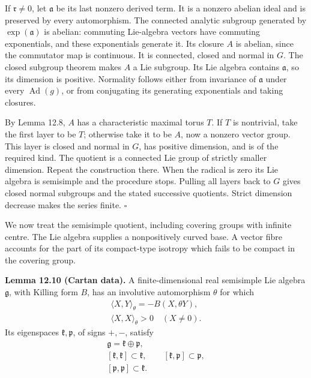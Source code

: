 \documentclass[
  11pt,
]{article}
\begin{document}
If \(\mathfrak r\ne0\), let \(\mathfrak a\) be its last nonzero derived
term. It is a nonzero abelian ideal and is preserved by every
automorphism. The connected analytic subgroup generated by
\(\exp(\mathfrak a)\) is abelian: commuting Lie-algebra vectors have
commuting exponentials, and these exponentials generate it. Its closure
\(A\) is abelian, since the commutator map is continuous. It is
connected, closed and normal in \(G\). The closed subgroup theorem makes
\(A\) a Lie subgroup. Its Lie algebra contains \(\mathfrak a\), so its
dimension is positive. Normality follows either from invariance of
\(\mathfrak a\) under every \(\operatorname{Ad}(g)\), or from
conjugating its generating exponentials and taking closures.

By Lemma 12.8, \(A\) has a characteristic maximal torus \(T\). If \(T\)
is nontrivial, take the first layer to be \(T\); otherwise take it to be
\(A\), now a nonzero vector group. This layer is closed and normal in
\(G\), has positive dimension, and is of the required kind. The quotient
is a connected Lie group of strictly smaller dimension. Repeat the
construction there. When the radical is zero its Lie algebra is
semisimple and the procedure stops. Pulling all layers back to \(G\)
gives closed normal subgroups and the stated successive quotients.
Strict dimension decrease makes the series finite. \(\square\)

We now treat the semisimple quotient, including covering groups with
infinite centre. The Lie algebra supplies a nonpositively curved base. A
vector fibre accounts for the part of its compact-type isotropy which
fails to be compact in the covering group.

\textbf{Lemma 12.10 (Cartan data).} A finite-dimensional real semisimple
Lie algebra \(\mathfrak g\), with Killing form \(B\), has an involutive
automorphism \(\theta\) for which \[
\begin{gathered}
\langle X,Y\rangle_\theta=-B(X,\theta Y),\\
\langle X,X\rangle_\theta>0\quad(X\ne0).
\end{gathered}
\tag{12.33}
\] Its eigenspaces \(\mathfrak k,\mathfrak p\), of signs \(+,-\),
satisfy \[
\begin{gathered}
\mathfrak g=\mathfrak k\oplus\mathfrak p,\\
[\mathfrak k,\mathfrak k]\subset\mathfrak k,\qquad
[\mathfrak k,\mathfrak p]\subset\mathfrak p,\\
[\mathfrak p,\mathfrak p]\subset\mathfrak k.
\end{gathered}
\tag{12.34}
\]
\end{document}
